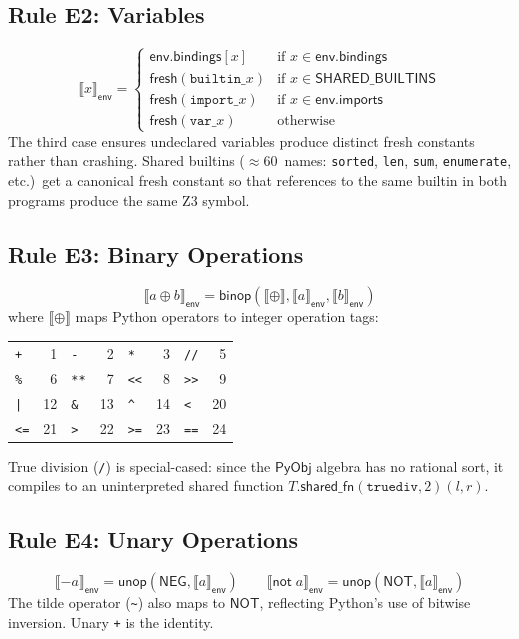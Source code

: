 \documentclass[11pt,a4paper]{report}
\theoremstyle{definition}
\theoremstyle{plain}
\newcommand{\den}[1]{\llbracket #1 \rrbracket}
\newcommand{\PyObj}{\mathsf{PyObj}}
\begin{document}
\subsection{Rule E2: Variables}
\[
  \den{x}_\mathsf{env} = \begin{cases}
    \mathsf{env.bindings}[x] & \text{if $x \in \mathsf{env.bindings}$} \\
    \mathsf{fresh}(\texttt{builtin\_}x)
      & \text{if $x \in \mathsf{SHARED\_BUILTINS}$} \\
    \mathsf{fresh}(\texttt{import\_}x)
      & \text{if $x \in \mathsf{env.imports}$} \\
    \mathsf{fresh}(\texttt{var\_}x) & \text{otherwise}
  \end{cases}
\]
The third case ensures undeclared variables produce distinct fresh
constants rather than crashing.  Shared builtins
($\approx$60~names: \texttt{sorted}, \texttt{len}, \texttt{sum},
\texttt{enumerate}, etc.)\ get a canonical fresh constant so that
references to the same builtin in both programs produce the same
Z3 symbol.

\subsection{Rule E3: Binary Operations}
\[
  \den{a \oplus b}_\mathsf{env} = \mathsf{binop}(\llbracket \oplus \rrbracket,
    \den{a}_\mathsf{env}, \den{b}_\mathsf{env})
\]
where $\llbracket \oplus \rrbracket$ maps Python operators to integer
operation tags:
\begin{center}
\small
\begin{tabular}{l r l r l r l r}
  \texttt{+} & 1 & \texttt{-} & 2 & \texttt{*} & 3 &
  \texttt{//} & 5 \\
  \texttt{\%} & 6 & \texttt{**} & 7 & \texttt{<<} & 8 &
  \texttt{>>} & 9 \\
  \texttt{|} & 12 & \texttt{\&} & 13 & \texttt{\^{}} & 14 &
  \texttt{<} & 20 \\
  \texttt{<=} & 21 & \texttt{>} & 22 &
  \texttt{>=} & 23 & \texttt{==} & 24 \\
\end{tabular}
\end{center}
True division (\texttt{/}) is special-cased: since the $\PyObj$
algebra has no rational sort, it compiles to an uninterpreted
shared function
$T.\mathsf{shared\_fn}(\texttt{truediv}, 2)(l, r)$.

\subsection{Rule E4: Unary Operations}
\[
  \den{-a}_\mathsf{env} = \mathsf{unop}(\mathsf{NEG}, \den{a}_\mathsf{env})
  \qquad
  \den{\mathsf{not}\; a}_\mathsf{env} = \mathsf{unop}(\mathsf{NOT},
    \den{a}_\mathsf{env})
\]
The tilde operator (\texttt{\~{}}) also maps to $\mathsf{NOT}$,
reflecting Python's use of bitwise inversion.  Unary \texttt{+}
is the identity.
\end{document}

